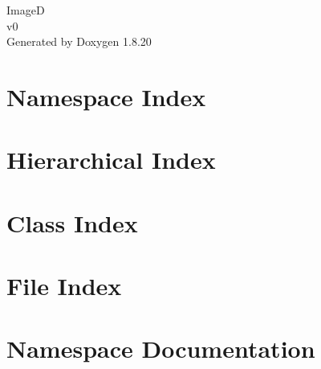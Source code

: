 \let\mypdfximage\pdfximage\def\pdfximage{\immediate\mypdfximage}\documentclass[twoside]{book}
\newcommand{\+}{\discretionary{\mbox{\scriptsize$\hookleftarrow$}}{}{}}
\newcommand{\clearemptydoublepage}{%
  \newpage{\pagestyle{empty}\cleardoublepage}%
}
\begin{document}
\hypersetup{pageanchor=false,
             bookmarksnumbered=true,
             pdfencoding=unicode
            }
\begin{titlepage}
\vspace*{7cm}
\begin{center}%
{\Large ImageD \\[1ex]\large v0 }\\
\vspace*{1cm}
{\large Generated by Doxygen 1.8.20}\\
\end{center}
\end{titlepage}
\clearemptydoublepage
{}
\tableofcontents
\clearemptydoublepage
{}
\hypersetup{pageanchor=true}

\chapter{Namespace Index}

\chapter{Hierarchical Index}

\chapter{Class Index}

\chapter{File Index}

\chapter{Namespace Documentation}

\end{document}
